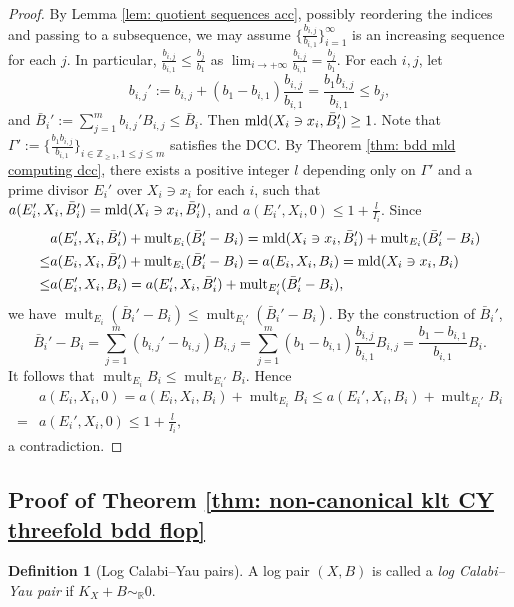 \documentclass[11pt]{amsart}
\numberwithin{equation}{section}
\newcommand{\Rr}{\mathbb{R}}
\newcommand{\Zz}{\mathbb{Z}}
\newcommand{\mld}{{\rm{mld}}}
\newcommand{\mult}{\operatorname{mult}}
\newcommand{\Ii}{{\Gamma}}
\theoremstyle{definition}
\theoremstyle{definition}
\newtheorem{defn}[thm]{Definition}
\begin{document}
\begin{proof}
By Lemma \ref{lem: quotient sequences acc}, possibly reordering the indices and passing to a subsequence, we may assume $\{\frac{b_{i,j}}{b_{i,1}}\}_{i=1}^{\infty}$ is an increasing sequence for each $j$. In particular, $\frac{b_{i,j}}{b_{i,1}}\le \frac{b_j}{b_1}$ as $\lim_{i\to +\infty} \frac{b_{i,j}}{b_{i,1}}=\frac{b_j}{b_1}$. For each $i,j$, let $$b_{i,j}':=b_{i,j}+(b_1-b_{i,1})\frac{b_{i,j}}{b_{i,1}}=\frac{b_{1}b_{i,j}}{b_{i,1}}\le b_{j},$$
and $\bar B_i':=\sum_{j=1}^m b_{i,j}'B_{i,j}\le \bar B_i$. Then $\mld(X_i\ni x_i,\bar B_i')\ge 1$. 
Note that $\Ii':=\{\frac{b_{1}b_{i,j}}{b_{i,1}}\}_{i\in\Zz_{\ge 1}, 1\le j\le m}$ satisfies the DCC. By Theorem \ref{thm: bdd mld computing dcc}, there exists a positive integer $l$ depending only on $\Ii'$ and a prime divisor $E_i'$ over $X_i\ni x_i$ for each $i$, such that $a(E_i',X_i,\bar B_i')=\mld(X_i\ni x_i,\bar B_i')$, and $a(E_i',X_i,0)\leq 1+\frac{l}{I_i}$. Since
\begin{align*}
&a(E_i',X_i,\bar B_i')+\mult _{E_i}(\bar B_i'-B_i)=\mld(X_i\ni x_i,\bar B_i')+\mult _{E_i}(\bar B_i'-B_i)\\
\le &a(E_i,X_i,\bar B_i')+\mult _{E_i}(\bar B_i'-B_i)=a(E_i,X_i,B_i)=\mld(X_i\ni x_i,B_i)\\
\le & a(E_i',X_i,B_i)=a(E_i',X_i,\bar B_i')+\mult _{E_i'}(\bar B_i'-B_i),
\end{align*}
we have $\mult _{E_i}(\bar B_i'-B_i)\le \mult _{E_i'}(\bar B_i'-B_i)$. By the construction of $\bar B_i'$,
$$\bar B_i'-B_i=\sum_{j=1}^m (b_{i,j}'-b_{i,j})B_{i,j}=\sum_{j=1}^m(b_1-b_{i,1})\frac{b_{i,j}}{b_{i,1}}B_{i,j}=\frac{b_1-b_{i,1}}{b_{i,1}}B_i.$$ It follows that $\mult _{E_i} B_i\le \mult _{E_i'} B_i$. Hence
\begin{align*}&a(E_i,X_i,0)=a(E_i,X_i,B_i)+\mult_{E_i}B_i
\le a(E_i',X_i,B_i)+\mult_{E_i'}B_i\\
=&a(E_i',X_i,0)\le 1+\frac{l}{I_i},
\end{align*}
a contradiction.
\end{proof}





\subsection{Proof of Theorem \ref{thm: non-canonical klt CY threefold bdd flop}}
\begin{defn}[Log Calabi--Yau pairs]
A log pair $(X, B)$ is called a
\emph{log Calabi--Yau pair} if $K_X+B\sim_\Rr 0$. %
\end{defn}
\end{document}
